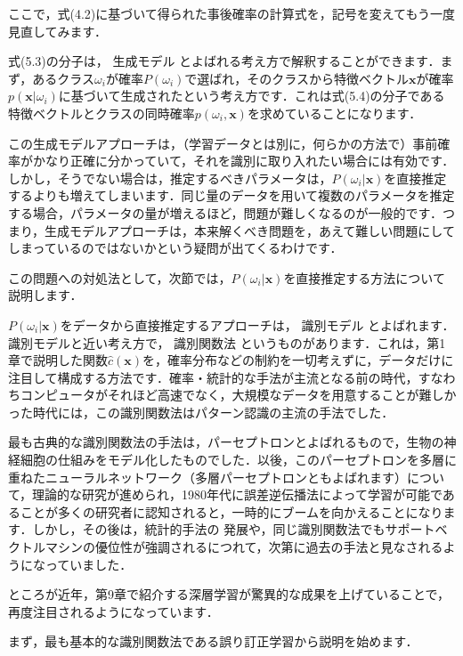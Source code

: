 
ここで，式(4.2)に基づいて得られた事後確率の計算式を，記号を変えてもう一度見直してみます．

式(5.3)の分子は，
生成モデル
とよばれる考え方で解釈することができます．まず，あるクラス$\omega_i$が確率$P(\omega_i)$で選ばれ，そのクラスから特徴ベクトル$\bm{x}$が確率$p(\bm{x} \vert \omega_i)$に基づいて生成されたという考え方です．これは式(5.4)の分子である特徴ベクトルとクラスの同時確率$p(\omega_i, \bm{x})$を求めていることになります．

この生成モデルアプローチは，（学習データとは別に，何らかの方法で）事前確率がかなり正確に分かっていて，それを識別に取り入れたい場合には有効です．しかし，そうでない場合は，推定するべきパラメータは，$P(\omega_i|\bm{x})$を直接推定するよりも増えてしまいます．同じ量のデータを用いて複数のパラメータを推定する場合，パラメータの量が増えるほど，問題が難しくなるのが一般的です．つまり，生成モデルアプローチは，本来解くべき問題を，あえて難しい問題にしてしまっているのではないかという疑問が出てくるわけです．

この問題への対処法として，次節では，$P(\omega_i|\bm{x})$を直接推定する方法について説明します．


$P(\omega_i|\bm{x})$をデータから直接推定するアプローチは，
識別モデル
とよばれます．
識別モデルと近い考え方で，
識別関数法
というものがあります．これは，第1章で説明した関数$\hat{c}(\bm{x})$を，確率分布などの制約を一切考えずに，データだけに注目して構成する方法です．確率・統計的な手法が主流となる前の時代，すなわちコンピュータがそれほど高速でなく，大規模なデータを用意することが難しかった時代には，この識別関数法はパターン認識の主流の手法でした．

最も古典的な識別関数法の手法は，パーセプトロンとよばれるもので，生物の神経細胞の仕組みをモデル化したものでした．以後，このパーセプトロンを多層に重ねたニューラルネットワーク（多層パーセプトロンともよばれます）について，理論的な研究が進められ，1980年代に誤差逆伝播法によって学習が可能であることが多くの研究者に認知されると，一時的にブームを向かえることになります．しかし，その後は，統計的手法の
発展や，同じ識別関数法でもサポートベクトルマシンの優位性が強調されるにつれて，次第に過去の手法と見なされるようになっていました．

ところが近年，第9章で紹介する深層学習が驚異的な成果を上げていることで，再度注目されるようになっています．


まず，最も基本的な識別関数法である誤り訂正学習から説明を始めます．

